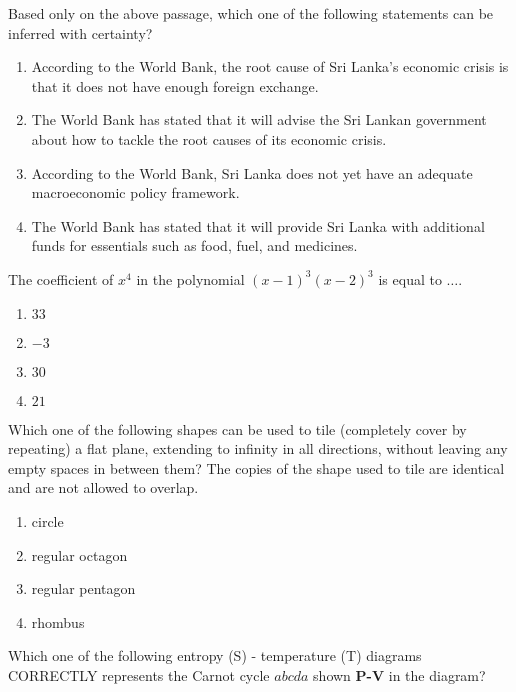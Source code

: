 Based only on the above passage, which one of the following statements can be
inferred with certainty?
\begin{enumerate}
    \item According to the World Bank, the root cause of Sri Lanka's economic crisis is that
it does not have enough foreign exchange.
  \item The World Bank has stated that it will advise the Sri Lankan government about how
to tackle the root causes of its economic crisis.
  \item According to the World Bank, Sri Lanka does not yet have an adequate
macroeconomic policy framework.
  \item The World Bank has stated that it will provide Sri Lanka with additional funds for
essentials such as food, fuel, and medicines.
\end{enumerate}
\item The coefficient of $x^4$ in the polynomial $(x-1)^3$$(x-2)^3$ is equal to $\dots$.
\begin{enumerate}
    \item $33$
    \item $-3$
    \item $30$
    \item $21$
\end{enumerate}
\item Which one of the following shapes can be used to tile (completely cover by
repeating) a flat plane, extending to infinity in all directions, without leaving any
empty spaces in between them? The copies of the shape used to tile are identical
and are not allowed to overlap.
\begin{enumerate}
    \item circle
    \item regular octagon
    \item regular pentagon
    \item rhombus
\end{enumerate}
\item Which one of the following entropy (S) - temperature (T) diagrams CORRECTLY
represents the Carnot cycle $abcda$ shown \textbf{P-V} in the diagram?


